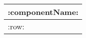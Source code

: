 \begin{table}[H]
\begin{center}
\begin{tabular}{p{\tabellenzweispaltenbreiteerste} p{\tabellenzweispaltenbreitezweite}}
        \multicolumn{2}{c}{
        \cellcolor{\mtabellenkopfhintergrundfarbe}         
        \textcolor{\mtabellenkopfschriftfarbe}{\textbf{:componentName:}}                %
    } \\ \hline
    :row:                                                                               %
\end{tabular}
\end{center}
\end{table}
